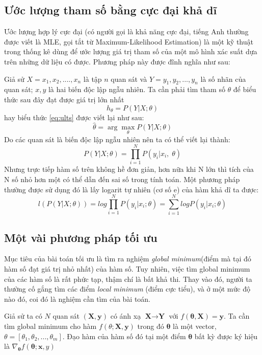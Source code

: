 \subsection{Ước lượng tham số bằng cực đại khả dĩ}
\hspace{5mm} Ước lượng hợp lý cực đại (có người gọi là khả năng cực đại, tiếng Anh thường được viết là MLE, gọi tắt từ Maximum-Likelihood Estimation) là một kỹ thuật trong thống kê dùng để ước lượng giá trị tham số của một mô hình xác suất dựa trên những dữ liệu có được. Phương pháp này được đĩnh nghĩa như sau:\par
Giả sử $X=x_1,x_2,....,x_n$ là tập $n$ quan sát và $Y=y_1,y_2,...,y_n$ là số nhãn của quan sát; $x,y$ là hai biến độc lập ngẫu nhiên. Ta cần phải tìm tham số $\theta$ để biểu thức sau đây đạt được giá trị lớn nhất
\begin{equation}
\label{eq:ults}
h_{\theta} = P(Y|X;\theta)
\end{equation} 
hay biểu thức \ref{eq:ults} được viết lại như sau:
\begin{equation}
\widehat{\theta} = \arg\max_{\theta}P(Y|X;\theta)
\end{equation}
Do các quan sát là biến độc lập ngẫu nhiên nên ta có thể viết lại thành:
\begin{equation}
P(Y|X;\theta) = \prod^N_{i=1}P(y_i|x_i,\;\theta)
\end{equation}
Nhưng trực tiếp hàm số trên không hề đơn giản, hơn nữa khi N lớn thì tích của N số nhỏ hơn một có thể dẫn đến sai số trong tính toán. Một phương pháp thường được sử dụng đó là lấy logarit	tự nhiên (cơ số e) của hàm khả dĩ ta được:
\begin{equation}
l(P(Y|X;\theta)) = log\prod_{i=1}^N P(y_i|x_i;\theta)=\sum_{i=1}^NlogP(y_i|x_i;\theta)
\end{equation}
\subsection{Một vài phương pháp tối ưu}
\label{sec:toiuu}
\hspace{5mm} Mục tiêu của bài toán tối ưu là tìm ra nghiệm \textit{global minimum}(điểm mà tại đó hàm số đạt giá trị nhỏ nhất) của hàm số.  Tuy nhiên, việc tìm global minimum của các hàm số là rất phức tạp, thậm chí là bất khả thi. Thay vào đó, người ta thường cố gắng tìm các điểm \textit{local minimum} (điểm cực tiểu), và ở một mức độ nào đó, coi đó là nghiệm cần tìm của bài toán.\par
Giả sử ta có $N$ quan sát $(\textbf{X},\textbf{y})$ có ánh xạ $\textbf{X} \to \textbf{Y}$ với $f(\mathbf{\theta},\textbf{X})=\textbf{y}$. Ta cần tìm global minimum cho hàm $f(\theta;\textbf{X},\textbf{y})$ trong đó $\mathbf{\theta}$ là một vector, $\theta=[\theta_1,\theta_2,...,\theta_m]$. Đạo hàm của hàm số đó tại một điểm   $\mathbf{\theta}$ bất kỳ được ký hiệu là $\nabla_\mathbf{\theta} f(\mathbf{\theta};\textbf{x},y)$
